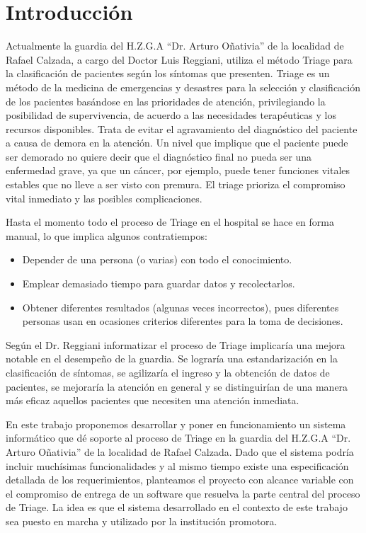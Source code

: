 \section{Introducción}

Actualmente la guardia del H.Z.G.A ``Dr. Arturo Oñativia'' de la localidad de Rafael Calzada, a cargo del Doctor Luis Reggiani, utiliza el método Triage \cite{Derlet,Manual} para la clasificación de pacientes según los síntomas que presenten. 
Triage es un método de la medicina de emergencias y desastres para la selección y clasificación de los pacientes basándose en las prioridades de atención, privilegiando la posibilidad de supervivencia, de acuerdo a las necesidades terapéuticas y los recursos disponibles. Trata de evitar el agravamiento del diagnóstico del paciente a causa de demora en la atención. Un nivel que implique que el paciente puede ser demorado no quiere decir que el diagnóstico final no pueda ser una enfermedad grave, ya que un cáncer, por ejemplo, puede tener funciones vitales estables que no lleve a ser visto con premura. El triage prioriza el compromiso vital inmediato y las posibles complicaciones.

Hasta el momento todo el proceso de Triage en el hospital se hace en forma manual, lo que implica algunos contratiempos:
\begin{itemize}
\item Depender de una persona (o varias) con todo el conocimiento.
\item Emplear demasiado tiempo para guardar datos y recolectarlos.
\item Obtener diferentes resultados (algunas veces incorrectos), pues diferentes personas usan en ocasiones criterios diferentes para la toma de decisiones.
\end{itemize}

Según el Dr. Reggiani informatizar el proceso de Triage implicaría una mejora notable en el desempeño de la guardia. Se lograría una estandarización en la clasificación de síntomas, se agilizaría el ingreso y la obtención de datos de pacientes, se mejoraría la atención en general y se distinguirían de una manera más eficaz aquellos pacientes que necesiten una atención inmediata.



En este trabajo proponemos desarrollar y poner en funcionamiento un sistema informático que dé soporte al proceso de Triage en la guardia del H.Z.G.A ``Dr. Arturo Oñativia'' de la localidad de Rafael Calzada. Dado que el sistema podría incluir muchísimas funcionalidades y al mismo tiempo existe una especificación detallada de los requerimientos, planteamos el proyecto con alcance variable con el compromiso de entrega de un software que resuelva la parte central del proceso de Triage. La idea es que el sistema desarrollado en el contexto de este trabajo sea puesto en marcha y utilizado por la institución promotora.

